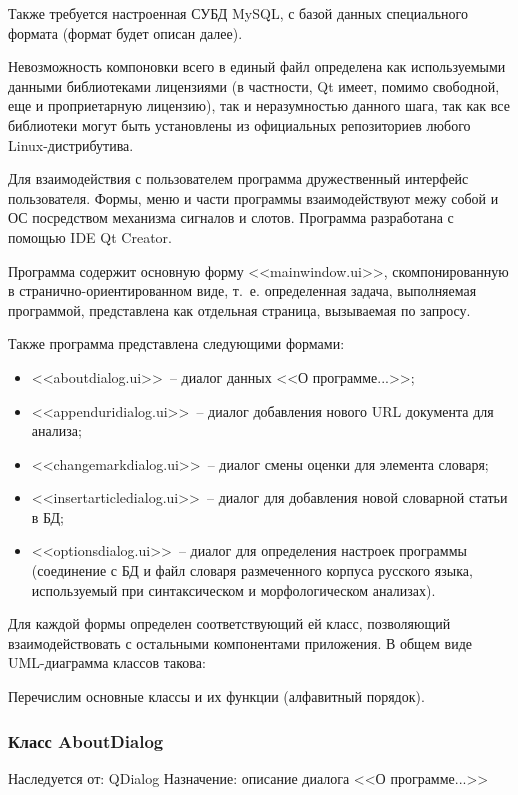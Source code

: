 \documentclass[a4paper,14pt,russian]{extreport}
\begin{document}
Также требуется настроенная СУБД MySQL, с базой данных специального формата (формат будет описан далее).

Невозможность компоновки всего в единый файл определена как используемыми данными библиотеками лицензиями (в частности, Qt имеет, помимо свободной, еще и проприетарную лицензию), так и неразумностью данного шага, так как все библиотеки могут быть установлены из официальных репозиториев любого Linux-дистрибутива.

Для взаимодействия с пользователем программа дружественный интерфейс пользователя. Формы, меню и части программы взаимодействуют межу собой и ОС посредством механизма сигналов и слотов. Программа разработана с помощью IDE Qt Creator.

Программа содержит основную форму <<mainwindow.ui>>, скомпонированную в странично-ориентированном виде, т.~е. определенная задача, выполняемая программой, представлена как отдельная страница, вызываемая по запросу.

Также программа представлена следующими формами:

\begin{itemize}
\item <<aboutdialog.ui>>~-- диалог данных <<О программе...>>;
\item <<appenduridialog.ui>>~-- диалог добавления нового URL документа для анализа;
\item <<changemarkdialog.ui>>~-- диалог смены оценки для элемента словаря;
\item <<insertarticledialog.ui>>~-- диалог для добавления новой словарной статьи в БД;
\item <<optionsdialog.ui>>~-- диалог для определения настроек программы (соединение с БД и файл словаря размеченного корпуса русского языка, используемый при синтаксическом и морфологическом анализах).
\end{itemize}

Для каждой формы определен соответствующий ей класс,  позволяющий взаимодействовать с остальными компонентами приложения. В общем виде UML-диаграмма классов такова:

Перечислим основные классы и их функции (алфавитный порядок).

\subsubsection{Класс AboutDialog}

Наследуется от: QDialog
Назначение: описание диалога <<О программе...>>
\end{document}
